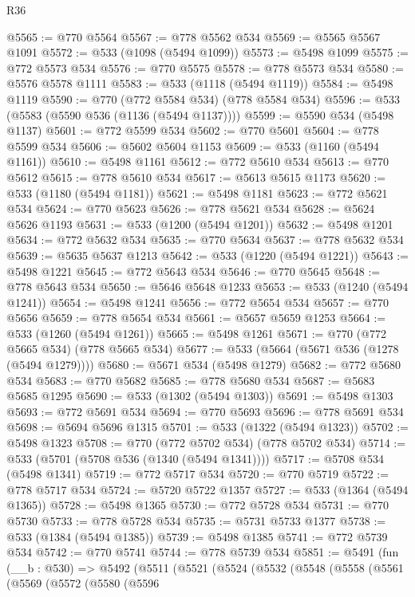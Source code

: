 \begin{lexlean}{R36}
\begin{coremodule}
@5565 := @770 @5564
@5567 := @778 @5562 @534
@5569 := @5565 @5567 @1091
@5572 := @533 (@1098 (@5494 @1099))
@5573 := @5498 @1099
@5575 := @772 @5573 @534
@5576 := @770 @5575
@5578 := @778 @5573 @534
@5580 := @5576 @5578 @1111
@5583 := @533 (@1118 (@5494 @1119))
@5584 := @5498 @1119
@5590 := @770 (@772 @5584 @534) (@778 @5584 @534)
@5596 := @533 (@5583 (@5590 @536 (@1136 (@5494 @1137))))
@5599 := @5590 @534 (@5498 @1137)
@5601 := @772 @5599 @534
@5602 := @770 @5601
@5604 := @778 @5599 @534
@5606 := @5602 @5604 @1153
@5609 := @533 (@1160 (@5494 @1161))
@5610 := @5498 @1161
@5612 := @772 @5610 @534
@5613 := @770 @5612
@5615 := @778 @5610 @534
@5617 := @5613 @5615 @1173
@5620 := @533 (@1180 (@5494 @1181))
@5621 := @5498 @1181
@5623 := @772 @5621 @534
@5624 := @770 @5623
@5626 := @778 @5621 @534
@5628 := @5624 @5626 @1193
@5631 := @533 (@1200 (@5494 @1201))
@5632 := @5498 @1201
@5634 := @772 @5632 @534
@5635 := @770 @5634
@5637 := @778 @5632 @534
@5639 := @5635 @5637 @1213
@5642 := @533 (@1220 (@5494 @1221))
@5643 := @5498 @1221
@5645 := @772 @5643 @534
@5646 := @770 @5645
@5648 := @778 @5643 @534
@5650 := @5646 @5648 @1233
@5653 := @533 (@1240 (@5494 @1241))
@5654 := @5498 @1241
@5656 := @772 @5654 @534
@5657 := @770 @5656
@5659 := @778 @5654 @534
@5661 := @5657 @5659 @1253
@5664 := @533 (@1260 (@5494 @1261))
@5665 := @5498 @1261
@5671 := @770 (@772 @5665 @534) (@778 @5665 @534)
@5677 := @533 (@5664 (@5671 @536 (@1278 (@5494 @1279))))
@5680 := @5671 @534 (@5498 @1279)
@5682 := @772 @5680 @534
@5683 := @770 @5682
@5685 := @778 @5680 @534
@5687 := @5683 @5685 @1295
@5690 := @533 (@1302 (@5494 @1303))
@5691 := @5498 @1303
@5693 := @772 @5691 @534
@5694 := @770 @5693
@5696 := @778 @5691 @534
@5698 := @5694 @5696 @1315
@5701 := @533 (@1322 (@5494 @1323))
@5702 := @5498 @1323
@5708 := @770 (@772 @5702 @534) (@778 @5702 @534)
@5714 := @533 (@5701 (@5708 @536 (@1340 (@5494 @1341))))
@5717 := @5708 @534 (@5498 @1341)
@5719 := @772 @5717 @534
@5720 := @770 @5719
@5722 := @778 @5717 @534
@5724 := @5720 @5722 @1357
@5727 := @533 (@1364 (@5494 @1365))
@5728 := @5498 @1365
@5730 := @772 @5728 @534
@5731 := @770 @5730
@5733 := @778 @5728 @534
@5735 := @5731 @5733 @1377
@5738 := @533 (@1384 (@5494 @1385))
@5739 := @5498 @1385
@5741 := @772 @5739 @534
@5742 := @770 @5741
@5744 := @778 @5739 @534
@5851 := @5491
    (fun (__b : @530) =>
    @5492
      (@5511
        (@5521
          (@5524
            (@5532
              (@5548
                (@5558
                  (@5561
                    (@5569
                      (@5572
                        (@5580
                          (@5596

\end{coremodule}
\end{lexlean}
